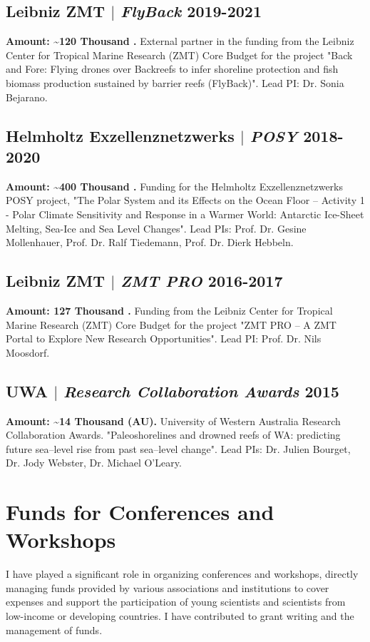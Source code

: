 \documentclass[11pt]{article}
\begin{document}
\subsection{Leibniz ZMT $|$ {\normalfont\textit{FlyBack}} \hfill 2019-2021}
{\footnotesize \textbf{Amount: \textasciitilde120 Thousand \texteuro.} External partner in the funding from the Leibniz Center for Tropical Marine Research (ZMT) Core Budget for the project  "Back and Fore: Flying drones over Backreefs to infer shoreline protection and fish biomass production sustained by barrier reefs (FlyBack)". Lead PI: Dr. Sonia Bejarano.}
\bigskip

\subsection{Helmholtz Exzellenznetzwerks $|$ {\normalfont\textit{POSY}} \hfill 2018-2020}
{\footnotesize \textbf{Amount: \textasciitilde400 Thousand \texteuro.} Funding for the Helmholtz Exzellenznetzwerks POSY project, "The Polar System and its Effects on the Ocean Floor – Activity 1 - Polar Climate Sensitivity and Response in a Warmer World: Antarctic Ice-Sheet Melting, Sea-Ice and Sea Level Changes". Lead PIs: Prof. Dr. Gesine Mollenhauer, Prof. Dr. Ralf Tiedemann, Prof. Dr. Dierk Hebbeln.}
\bigskip

\subsection{Leibniz ZMT $|$ {\normalfont\textit{ZMT PRO}} \hfill 2016-2017}
{\footnotesize \textbf{Amount: 127 Thousand \texteuro.} Funding from the Leibniz Center for Tropical Marine Research (ZMT) Core Budget for the project "ZMT PRO – A ZMT Portal to Explore New Research Opportunities". Lead PI: Prof. Dr. Nils Moosdorf.}
\bigskip

\bigskip
\subsection{UWA $|$ {\normalfont\textit{Research Collaboration Awards}} \hfill 2015}
{\footnotesize \textbf{Amount: \textasciitilde14 Thousand \textdollar (AU).}  University of Western Australia Research Collaboration Awards. "Paleoshorelines and drowned reefs of WA: predicting future sea–level rise from past sea–level change". Lead PIs: Dr. Julien Bourget, Dr. Jody Webster, Dr. Michael O'Leary.}

\section{Funds for Conferences and Workshops}
{\normalfont I have played a significant role in organizing conferences and workshops, directly managing funds provided by various associations and institutions to cover expenses and support the participation of young scientists and scientists from low-income or developing countries. I have contributed to grant writing and the management of funds.}\\
\end{document}
